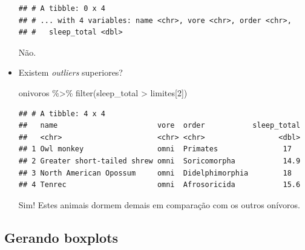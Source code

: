 \documentclass[
  11pt]{report}
\newenvironment{Shaded}{\begin{snugshade}}{\end{snugshade}}
\newcommand{\DecValTok}[1]{\textcolor[rgb]{0.00,0.00,0.81}{#1}}
\newcommand{\FunctionTok}[1]{\textcolor[rgb]{0.00,0.00,0.00}{#1}}
\newcommand{\NormalTok}[1]{#1}
\newcommand{\SpecialCharTok}[1]{\textcolor[rgb]{0.00,0.00,0.00}{#1}}
\renewenvironment{Shaded}{
    \begin{mdframed}[%
      roundcorner=2pt,%
      innerleftmargin=5pt,%
      innerrightmargin=5pt,%
      topline=true,%
      leftline=true,%
      rightline=true,%
      bottomline=true,%
      linewidth=0.5pt,%
      linecolor=black!20,%
      backgroundcolor=black!2,%
      skipabove=2ex,%
      skipbelow=2.5ex%
    ]%
  }
  {
    \end{mdframed}
  }
\begin{document}
\begin{itemize}
\begin{verbatim}
## # A tibble: 0 x 4
## # ... with 4 variables: name <chr>, vore <chr>, order <chr>,
## #   sleep_total <dbl>
\end{verbatim}

  Não.
\item
  Existem \emph{outliers} superiores?

\begin{Shaded}
\begin{Highlighting}[]
\NormalTok{onivoros }\SpecialCharTok{\%\textgreater{}\%} 
  \FunctionTok{filter}\NormalTok{(sleep\_total }\SpecialCharTok{\textgreater{}}\NormalTok{ limites[}\DecValTok{2}\NormalTok{])}
\end{Highlighting}
\end{Shaded}

\begin{verbatim}
## # A tibble: 4 x 4
##   name                       vore  order           sleep_total
##   <chr>                      <chr> <chr>                 <dbl>
## 1 Owl monkey                 omni  Primates               17  
## 2 Greater short-tailed shrew omni  Soricomorpha           14.9
## 3 North American Opossum     omni  Didelphimorphia        18  
## 4 Tenrec                     omni  Afrosoricida           15.6
\end{verbatim}

  Sim! Estes animais dormem demais em comparação com os outros onívoros.
\end{itemize}

\hypertarget{gerando-boxplots}{%
\subsection{Gerando boxplots}\label{gerando-boxplots}}
\end{document}
